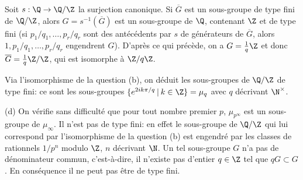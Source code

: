 {{Soit $s:\Q\rightarrow \Q/\Z$ la surjection canonique. Si $\overline G$ est un
sous-groupe de type fini de $\Q/\Z$, alors $G=s^{-1}(\overline G)$ est un sous-groupe de
$\Q$, contenant $\Z$ et de type fini (si $p_1/q_1,\ldots,p_r/q_r$ sont des ant\'ec\'edents
par $s$ de g\'en\'erateurs de $\overline G$, alors $1,p_1/q_1,\ldots,p_r/q_r$ engendrent $G$).
D'apr\`es ce qui pr\'ec\`ede, on a $G= \frac{1}{q}\Z$ et donc $\overline G =
\frac{1}{q}\Z/\Z$, qui est isomorphe \`a $\Z/q\Z$.
\smallskip

Via l'isomorphisme de la question (b), on d\'eduit les sous-groupes de $\Q/\Z$ de type fini:
ce sont les sous-groupes $\{e^{2ik\pi/q}\hskip 2pt |\hskip 2pt  k\in \Z\} = \mu_q$ avec $q$
d\'ecrivant
$\N^\times$. \smallskip

(d) On v\'erifie sans difficult\'e que pour tout nombre premier $p$, $\mu_{p^\infty}$ est
un sous-groupe de $\mu_\infty$. Il n'est pas de type fini: en effet le sous-groupe de
$\Q/\Z$ qui lui correspond par l'isomorphisme de la question (b) est engendr\'e par les
classes de rationnels $1/p^n$ modulo $\Z$, $n$ d\'ecrivant $\N$. Un tel sous-groupe $G$ n'a
pas de d\'enominateur commun, c'est-\`a-dire, il n'existe pas d'entier $q\in \Z$ tel que
$qG\subset G$. En cons\'equence il ne peut pas \^etre de type fini.}
}